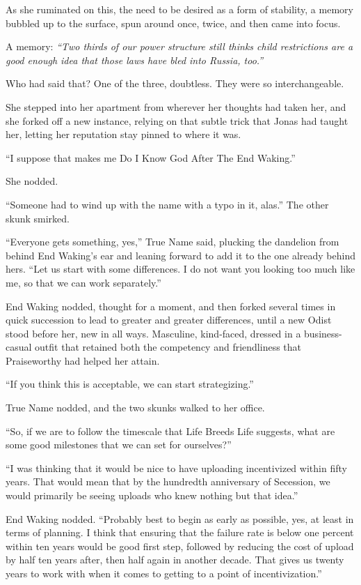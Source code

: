 As she ruminated on this, the need to be desired as a form of stability, a memory bubbled up to the surface, spun around once, twice, and then came into focus.

A memory: \emph{``Two thirds of our power structure still thinks child restrictions are a good enough idea that those laws have bled into Russia, too.''}

Who had said that? One of the three, doubtless. They were so interchangeable.

She stepped into her apartment from wherever her thoughts had taken her, and she forked off a new instance, relying on that subtle trick that Jonas had taught her, letting her reputation stay pinned to where it was.

``I suppose that makes me Do I Know God After The End Waking.''

She nodded.

``Someone had to wind up with the name with a typo in it, alas.'' The other skunk smirked.

``Everyone gets something, yes,'' True Name said, plucking the dandelion from behind End Waking's ear and leaning forward to add it to the one already behind hers. ``Let us start with some differences. I do not want you looking too much like me, so that we can work separately.''

End Waking nodded, thought for a moment, and then forked several times in quick succession to lead to greater and greater differences, until a new Odist stood before her, new in all ways. Masculine, kind-faced, dressed in a business-casual outfit that retained both the competency and friendliness that Praiseworthy had helped her attain.

``If you think this is acceptable, we can start strategizing.''

True Name nodded, and the two skunks walked to her office.

``So, if we are to follow the timescale that Life Breeds Life suggests, what are some good milestones that we can set for ourselves?''

``I was thinking that it would be nice to have uploading incentivized within fifty years. That would mean that by the hundredth anniversary of Secession, we would primarily be seeing uploads who knew nothing but that idea.''

End Waking nodded. ``Probably best to begin as early as possible, yes, at least in terms of planning. I think that ensuring that the failure rate is below one percent within ten years would be good first step, followed by reducing the cost of upload by half ten years after, then half again in another decade. That gives us twenty years to work with when it comes to getting to a point of incentivization.''


